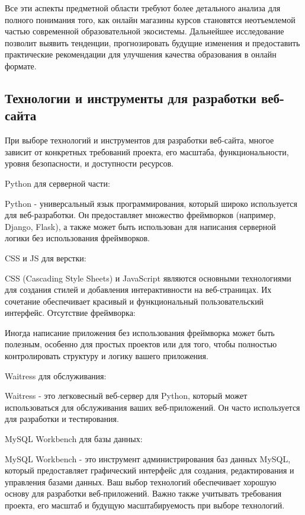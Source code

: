 Все эти аспекты предметной области требуют более детального анализа для полного понимания того, как онлайн магазины курсов становятся неотъемлемой частью современной образовательной экосистемы. Дальнейшее исследование позволит выявить тенденции, прогнозировать будущие изменения и предоставить практические рекомендации для улучшения качества образования в онлайн формате.
\subsection{Технологии и инструменты для разработки веб-сайта}

При выборе технологий и инструментов для разработки веб-сайта, многое зависит от конкретных требований проекта, его масштаба, функциональности, уровня безопасности, и доступности ресурсов. 

Python для серверной части:

Python - универсальный язык программирования, который широко используется для веб-разработки. Он предоставляет множество фреймворков (например, Django, Flask), а также может быть использован для написания серверной логики без использования фреймворков.

CSS и JS для верстки:

CSS (Cascading Style Sheets) и JavaScript являются основными технологиями для создания стилей и добавления интерактивности на веб-страницах. Их сочетание обеспечивает красивый и функциональный пользовательский интерфейс.
Отсутствие фреймворка:

Иногда написание приложения без использования фреймворка может быть полезным, особенно для простых проектов или для того, чтобы полностью контролировать структуру и логику вашего приложения.

Waitress для обслуживания:

Waitress - это легковесный веб-сервер для Python, который может использоваться для обслуживания ваших веб-приложений. Он часто используется для разработки и тестирования.

MySQL Workbench для базы данных:

MySQL Workbench - это инструмент администрирования баз данных MySQL, который предоставляет графический интерфейс для создания, редактирования и управления базами данных.
Ваш выбор технологий обеспечивает хорошую основу для разработки веб-приложений. Важно также учитывать требования проекта, его масштаб и будущую масштабируемость при выборе технологий.
